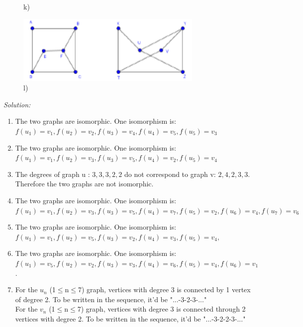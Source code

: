 \documentclass[a4paper]{article}
\begin{document}
\begin{figure}[ht]
\begin{minipage}{0.5\textwidth}
			\caption*{k)}
		\end{minipage}
		\begin{minipage}{0.5\textwidth}
			\centering
			\includegraphics[width=0.8\textwidth]{gprob4_12.png}
			\caption*{l)}
		\end{minipage}
	\end{figure}
	\emph{Solution:}
	\begin{enumerate}[label = \alph*)] 
	    \item The two graphs are isomorphic. One isomorphism is: \\ $f(u_1) = v_1 , f(u_2) = v_2, f(u_3) = v_4,f(u_4) = v_5, f(u_5) = v_3$
	    \item The two graphs are isomorphic. One isomorphism is:\\ $f(u_1) = v_1 , f(u_2) = v_3, f(u_3) = v_5,f(u_4) = v_2, f(u_5) = v_4$
	    \item The degrees of graph u : $3,3,3,2,2$ do not correspond to graph v: $2,4,2,3,3$. Therefore the two graphs are not isomorphic.
	    \item The two graphs are isomorphic. One isomorphism is:\\ $f(u_1) = v_1 , f(u_2) = v_3, f(u_3) = v_5,f(u_4) = v_7, f(u_5) = v_2, f(u_6) = v_4, f(u_7) = v_6$
	    \item The two graphs are isomorphic. One isomorphism is:\\ $f(u_1) = v_1 , f(u_2) = v_5, f(u_3) = v_2,f(u_4) = v_3, f(u_5) = v_4, $
	    \item The two graphs are isomorphic. One isomorphism is:\\ $f(u_1) = v_5 , f(u_2) = v_2, f(u_3) = v_3,f(u_4) = v_6, f(u_5) = v_4, f(u_6) = v_1 $.
	    \item
	    For the $u_n$ (1$\leq$n$\leq$7) graph, vertices with degree 3 is connected by 1 vertex of degree 2. To be written in the sequence, it'd be "...-3-2-3-..." \\
	    For the $v_n$ (1$\leq$n$\leq$7) graph, vertices with degree 3 is connected through 2 vertices with degree 2. To be written in the sequence, it'd be "...-3-2-2-3-..." \\

\end{enumerate}
\end{document}
